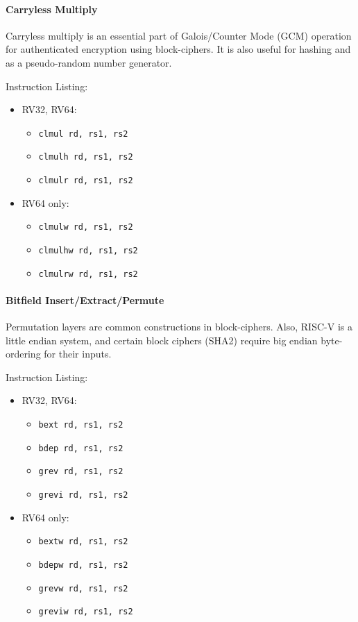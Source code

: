 \paragraph{Carryless Multiply}
Carryless multiply is an essential part of Galois/Counter Mode (GCM)
operation for authenticated encryption using block-ciphers.
It is also useful for hashing and as a pseudo-random number generator.

Instruction Listing:
\begin{itemize}
\item RV32, RV64:
\begin{itemize}
\item {\tt clmul  rd, rs1, rs2}
\item {\tt clmulh rd, rs1, rs2}
\item {\tt clmulr rd, rs1, rs2}
\end{itemize}
\item RV64 only:
\begin{itemize}
\item {\tt clmulw  rd, rs1, rs2}
\item {\tt clmulhw rd, rs1, rs2}
\item {\tt clmulrw rd, rs1, rs2}
\end{itemize}
\end{itemize}

\paragraph{Bitfield Insert/Extract/Permute}
Permutation layers are common constructions in block-ciphers.
Also, RISC-V is a little endian system, and certain block ciphers (SHA2)
require big endian byte-ordering for their inputs.

Instruction Listing:
\begin{itemize}
\item RV32, RV64:
\begin{itemize}
\item {\tt bext   rd, rs1, rs2}
\item {\tt bdep   rd, rs1, rs2}
\item {\tt grev   rd, rs1, rs2}
\item {\tt grevi  rd, rs1, rs2}
\end{itemize}
\item RV64 only:
\begin{itemize}
\item {\tt bextw  rd, rs1, rs2}
\item {\tt bdepw  rd, rs1, rs2}
\item {\tt grevw  rd, rs1, rs2}
\item {\tt greviw rd, rs1, rs2}
\end{itemize}
\end{itemize}

